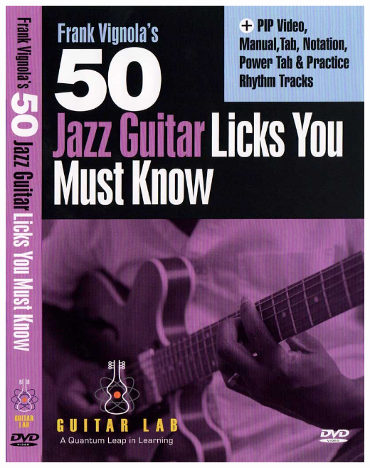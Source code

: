 \documentclass[a4paper]{book}
\begin{document}
\begin{center}
\includegraphics[width=17cm,height=21.652cm]{lebluessupportsmethodes-img89.jpg}
\end{center}



\clearpage
\end{document}
